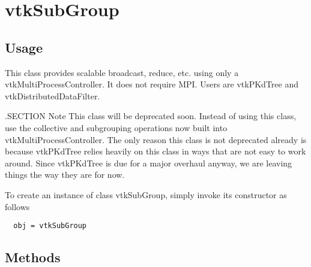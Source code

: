 \section{vtkSubGroup}

\subsection{Usage}

     This class provides scalable broadcast, reduce, etc. using
     only a vtkMultiProcessController. It does not require MPI.
     Users are vtkPKdTree and vtkDistributedDataFilter.

 .SECTION Note
 This class will be deprecated soon.  Instead of using this class, use the
 collective and subgrouping operations now built into
 vtkMultiProcessController.  The only reason this class is not deprecated
 already is because vtkPKdTree relies heavily on this class in ways that are
 not easy to work around.  Since vtkPKdTree is due for a major overhaul
 anyway, we are leaving things the way they are for now.


To create an instance of class vtkSubGroup, simply
invoke its constructor as follows
\begin{verbatim}
  obj = vtkSubGroup
\end{verbatim}
\subsection{Methods}

